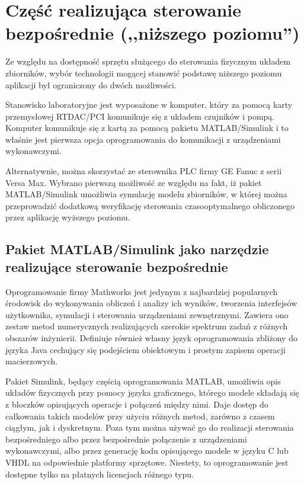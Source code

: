 \section{Część realizująca sterowanie bezpośrednie (,,niższego poziomu'')}
\label{sec:czesc-nizsza}

Ze względu na dostępność sprzętu służącego do sterowania fizycznym układem zbiorników, wybór technologii mogącej stanowić podstawę niższego poziomu aplikacji był ograniczony do dwóch możliwości.

Stanowisko laboratoryjne jest wyposażone w komputer, który za pomocą karty przemysłowej RTDAC/PCI komunikuje się z układem czujników i pompą. Komputer komunikuje się z kartą za pomocą pakietu MATLAB/Simulink i to właśnie jest pierwsza opcja oprogramowania do komunikacji z urządzeniami wykonawczymi.

Alternatywnie, można skorzystać ze sterownika PLC firmy GE Fanuc z serii Versa Max. Wybrano pierwszą możliwość ze względu na fakt, iż pakiet MATLAB/Simulink umożliwia symulację modelu zbiorników, w której można przeprowadzić dodatkową weryfikację sterowania czasooptymalnego obliczonego przez aplikację wyższego poziomu.

\subsection{Pakiet MATLAB/Simulink jako narzędzie realizujące sterowanie bezpośrednie}
\label{sub:czesc-nizsza-matlab}

Oprogramowanie firmy Mathworks jest jedynym z najbardziej popularnych środowisk do wykonywania obliczeń i analizy ich wyników, tworzenia interfejsów użytkownika, symulacji i sterowania urządzeniami zewnętrznymi. Zawiera ono zestaw metod numerycznych realizujących szerokie spektrum zadań z różnych obszarów inżynierii. Definiuje również własny język oprogramowania zbliżony do języka Java cechujący się podejściem obiektowym i prostym zapisem operacji macierzowych.

Pakiet Simulink, będący częścią oprogramowania MATLAB, umożliwia opis układów fizycznych przy pomocy języka graficznego, którego modele składają się z bloczków opisujących operacje i połączeń między nimi. Daje dostęp do całkowania takich modelów przy użyciu różnych metod, zarówno z czasem ciągłym, jak i dyskretnym. Poza tym można używać go do realizacji sterowania bezpośredniego albo przez bezpośrednie połączenie z urządzeniami wykonawczymi, albo przez generację kodu opisującego modele w języku C lub VHDL na odpowiednie platformy sprzętowe.
Niestety, to oprogramowanie jest dostępne tylko na płatnych licencjach różnego typu.

